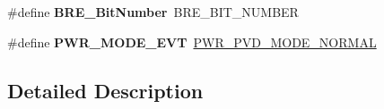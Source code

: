 \begin{DoxyCompactItemize}
\item 
\hypertarget{group___h_a_l___p_w_r___aliased_ga1a0832bfe421cdd6f2640ffb625cc2d8}{\#define {\bfseries B\-R\-E\-\_\-\-Bit\-Number}~B\-R\-E\-\_\-\-B\-I\-T\-\_\-\-N\-U\-M\-B\-E\-R}\label{group___h_a_l___p_w_r___aliased_ga1a0832bfe421cdd6f2640ffb625cc2d8}

\item 
\hypertarget{group___h_a_l___p_w_r___aliased_ga1092f618f6edca6f56e410e926455774}{\#define {\bfseries P\-W\-R\-\_\-\-M\-O\-D\-E\-\_\-\-E\-V\-T}~\hyperlink{group___p_w_r___p_v_d___mode_ga3a4bf701a36a14a4edf4dc5a28153277}{P\-W\-R\-\_\-\-P\-V\-D\-\_\-\-M\-O\-D\-E\-\_\-\-N\-O\-R\-M\-A\-L}}\label{group___h_a_l___p_w_r___aliased_ga1092f618f6edca6f56e410e926455774}

\end{DoxyCompactItemize}


\subsection{Detailed Description}

